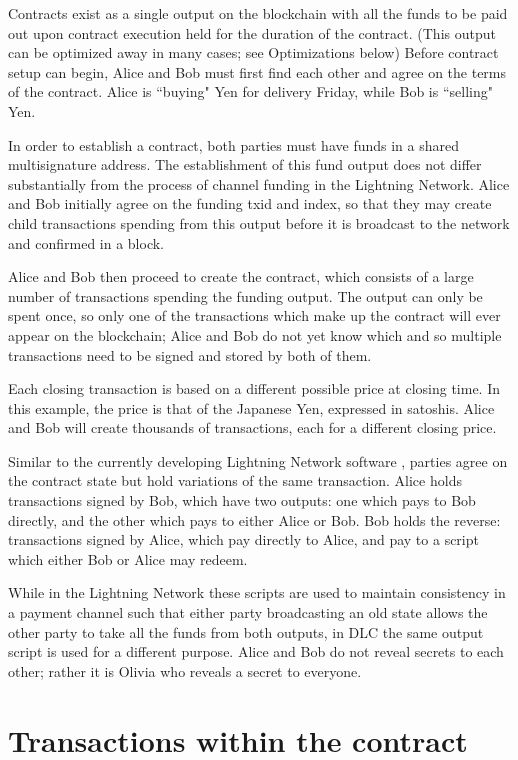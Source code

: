 \documentclass[11pt]{article}
\begin{document}
Contracts exist as a single output on the blockchain with all the funds to be paid out upon contract execution held for the duration of the contract.  (This output can be optimized away in many cases; see Optimizations below)  Before contract setup can begin, Alice and Bob must first find each other and agree on the terms of the contract.  Alice is ``buying" Yen for delivery Friday, while Bob is ``selling" Yen.

In order to establish a contract, both parties must have funds in a shared multisignature address.  The establishment of this fund output does not differ substantially from the process of channel funding in the Lightning Network.  Alice and Bob initially agree on the funding txid and index, so that they may create child transactions spending from this output before it is broadcast to the network and confirmed in a block.

Alice and Bob then proceed to create the contract, which consists of a large number of transactions spending the funding output.  The output can only be spent once, so only one of the transactions which make up the contract will ever appear on the blockchain; Alice and Bob do not yet know which and so multiple transactions need to be signed and stored by both of them.

Each closing transaction is based on a different possible price at closing time.  In this example, the price is that of the Japanese Yen, expressed in satoshis.  Alice and Bob will create thousands of transactions, each for a different closing price.  

Similar to the currently developing Lightning Network software \cite{lnpaper}, parties agree on the contract state but hold variations of the same transaction.  Alice holds transactions signed by Bob, which have two outputs: one which pays to Bob directly, and the other which pays to either Alice or Bob.  Bob holds the reverse: transactions signed by Alice, which pay directly to Alice, and pay to a script which either Bob or Alice may redeem.

While in the Lightning Network these scripts are used to maintain consistency in a payment channel such that either party broadcasting an old state allows the other party to take all the funds from both outputs, in DLC the same output script is used for a different purpose.  Alice and Bob do not reveal secrets to each other; rather it is Olivia who reveals a secret to everyone.


\section*{Transactions within the contract}
\end{document}
